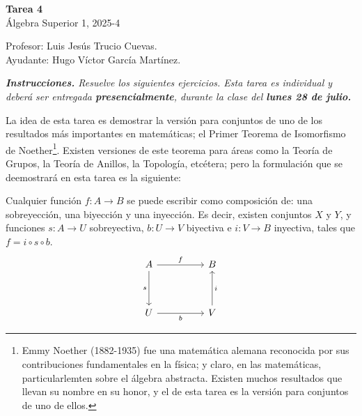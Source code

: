 \documentclass[letterpaper,DIV=14,headsepline,12pt]{scrartcl}
\begin{document}
    \begin{center}
        {\fontsize{30}{60}\rmfamily \textbf{Tarea 4}} \\ \vspace{.2cm}
        Álgebra Superior 1, 2025-4
    \end{center}
    \begin{flushright}
        \footnotesize \hfill Profesor: Luis Jesús Trucio Cuevas.\\
        \hfill Ayudante: Hugo Víctor García Martínez.
    \end{flushright}

    \noindent\textit{\textbf{Instrucciones.} Resuelve los siguientes ejercicios. Esta tarea es individual y deberá ser entregada \textbf{presencialmente}, durante la clase del \textbf{lunes 28 de julio.} \vspace{.4cm}}

    La idea de esta tarea es demostrar la versión para conjuntos de uno de los resultados más importantes en matemáticas; el Primer Teorema de Isomorfismo de Noether\footnote{Emmy Noether (1882-1935) fue una matemática alemana reconocida por sus contribuciones fundamentales en la física; y claro, en las matemáticas, particularlemten sobre el álgebra abstracta. Existen muchos resultados que llevan su nombre en su honor, y el de esta tarea es la versión para conjuntos de uno de ellos.}. Existen versiones de este teorema para áreas como la Teoría de Grupos, la Teoría de Anillos, la Topología, etcétera; pero la formulación que se deemostrará en esta tarea es la siguiente:

    \begin{teorema}\label{teo:primero}
        Cualquier función $f:A \to B$ se puede escribir como composición de: una sobreyección, una biyección y una inyección. Es decir, existen conjuntos $X$ y $Y$, y funciones $s:A \to U$ sobreyectiva, $b:U \to V$ biyectiva e $i:V \to B$ inyectiva, tales que $f = i \circ s \circ b$.
        \begin{equation}\label{eq:obj}
            \begin{tikzcd}
            A && B \\
            \\
            U && V
            \arrow["f", from=1-1, to=1-3]
            \arrow["s"', from=1-1, to=3-1]
            \arrow["b"', from=3-1, to=3-3]
            \arrow["i"', from=3-3, to=1-3]
        \end{tikzcd}
        \end{equation}
    \end{teorema}
\end{document}
